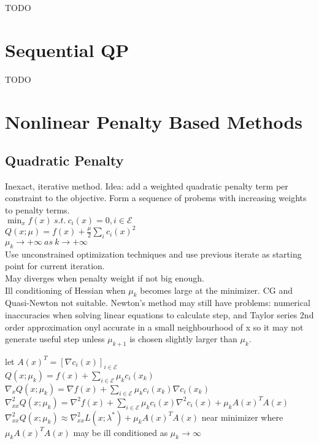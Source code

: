 \documentclass[8pt,letter]{article}
\begin{document}
\begin{multicols*}{2}
    TODO

    \vfill\null
    \pagebreak

    \section{Sequential QP}

    TODO

    \vfill\null
    \pagebreak
    
    \section{Nonlinear Penalty Based Methods}
    
    \subsection{Quadratic Penalty}
    
    Inexact, iterative method. Idea: add a weighted quadratic penalty term per constraint to the objective. Form a sequence of probems with increasing weights to penalty terms.\\
    
    $\min_x f(x)\ s.t.\ c_i(x)=0, i\in \mathcal{E}$\\
    $Q(x;\mu) = f(x) + \frac{\mu}{2} \sum_i c_i(x)^2$\\
    $\mu_k \rightarrow +\infty\ as\ k \rightarrow +\infty$\\

    Use unconstrained optimization techniques and use previous iterate as starting point for current iteration.\\
    
    May diverges when penalty weight if not big enough.\\

    Ill conditioning of Hessian when $\mu_k$ becomes large at the minimizer. CG and Quasi-Newton not suitable. Newton's method may still have problems: numerical inaccuracies when solving linear equations to calculate step, and Taylor series 2nd order approximation onyl accurate in a small neighbourhood of x so it may not generate useful step unless $\mu_{k+1}$ is chosen slightly larger than $\mu_k$.


    let $A(x)^T = [\nabla c_i(x)]_{i \in \mathcal{E}}$\\
    $Q(x; \mu_k) = f(x) + \sum_{i \in \mathcal{E}} \mu_k c_i(x_k)$\\
    $\nabla_x Q(x; \mu_k) = \nabla f(x) + \sum_{i \in \mathcal{E}} \mu_k c_i(x_k) \nabla c_i(x_k)$\\
    $\nabla_{xx}^2 Q(x; \mu_k) = \nabla^2 f(x) + \sum_{i \in \mathcal{E}} \mu_k c_i(x) \nabla^2 c_i(x) + \mu_k A(x)^TA(x)$\\
    $\nabla_{xx}^2 Q(x; \mu_k) \approx \nabla_{xx}^2 L(x; \lambda^*) + \mu_k A(x)^T A(x)$ near minimizer where $\mu_k A(x)^T A(x)$ may be ill conditioned as $\mu_k \rightarrow \infty$\\
    

\end{multicols*}
\end{document}
